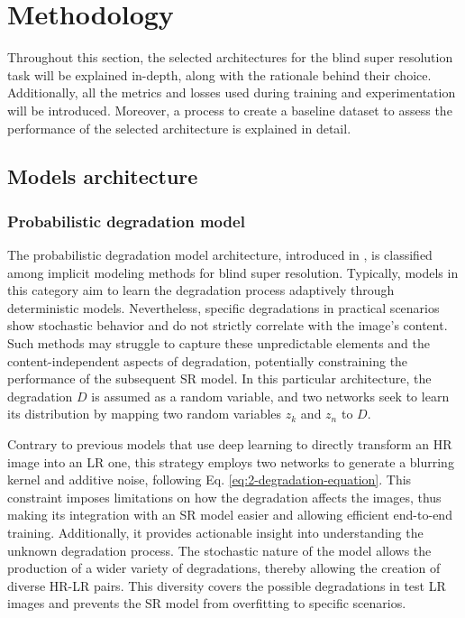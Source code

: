 \section{Methodology} \label{sec:methodology}

Throughout this section, the selected architectures for the blind super resolution task will be explained in-depth, along with the rationale behind their choice. Additionally, all the metrics and losses used during training and experimentation will be introduced. 
Moreover, a process to create a baseline dataset to assess the performance of the selected architecture is explained in detail. 


\subsection{Models architecture}

\subsubsection{Probabilistic degradation model}

    The probabilistic degradation model architecture, introduced in \cite{luo2022learning}, is classified among implicit modeling methods for blind super resolution.
    Typically, models in this category aim to learn the degradation process adaptively through deterministic models. Nevertheless, specific degradations in practical scenarios show stochastic behavior and do not strictly correlate with the image's content. Such methods may struggle to capture these unpredictable elements and the content-independent aspects of degradation, potentially constraining the performance of the subsequent SR model. In this particular architecture, the degradation \(D\) is assumed as a random variable, and two networks seek to learn its distribution by mapping two random variables $z_k$ and $z_n$ to \(D\). 

    Contrary to previous models that use deep learning to directly transform an HR image into an LR one, this strategy employs two networks to generate a blurring kernel and additive noise, following Eq. \ref{eq:2-degradation-equation}. This constraint imposes limitations on how the degradation affects the images, thus making its integration with an SR model easier and allowing efficient end-to-end training. Additionally, it provides actionable insight into understanding the unknown degradation process.
    The stochastic nature of the model allows the production of a wider variety of degradations, thereby allowing the creation of diverse HR-LR pairs. This diversity covers the possible degradations in test LR images and prevents the SR model from overfitting to specific scenarios.

